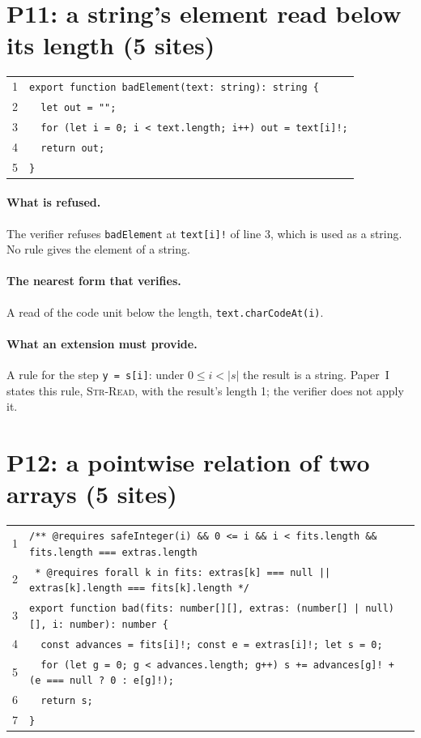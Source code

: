 \documentclass[10pt,a4paper]{article}
\theoremstyle{definition}
\theoremstyle{remark}
\newcommand{\len}[1]{|#1|}
\newcommand{\code}[1]{\texttt{#1}}
\newcommand{\entry}[1]{\paragraph{#1.}}
\begin{document}
\section{P11: a string's element read below its length (5 sites)}

{\footnotesize
\begin{tabular}{@{}r@{\hspace{1em}}l@{}}
1 & \code{export function badElement(text: string): string \{} \\
2 & \code{~~let out = "";} \\
3 & \code{~~for (let i = 0; i < text.length; i++) out = text[i]!;} \\
4 & \code{~~return out;} \\
5 & \code{\}} \\
\end{tabular}}

\entry{What is refused} The verifier refuses \code{badElement} at
\code{text[i]!} of line 3, which is used as a string. No rule gives
the element of a string.

\entry{The nearest form that verifies} A read of the code unit below the length,
\code{text.charCodeAt(i)}.

\entry{What an extension must provide} A rule for the step \code{y = s[i]}: under
$0\le i<\len{s}$ the result is a string. Paper~I states this rule,
\textsc{Str-Read}, with the result's length 1; the verifier does not
apply it.

\section{P12: a pointwise relation of two arrays (5 sites)}

{\footnotesize
\begin{tabular}{@{}r@{\hspace{1em}}l@{}}
1 & \code{/** @requires safeInteger(i) \&\& 0 <= i \&\& i < fits.length \&\& fits.length === extras.length} \\
2 & \code{~* @requires forall k in fits: extras[k] === null || extras[k].length === fits[k].length */} \\
3 & \code{export function bad(fits: number[][], extras: (number[] | null)[], i: number): number \{} \\
4 & \code{~~const advances = fits[i]!; const e = extras[i]!; let s = 0;} \\
5 & \code{~~for (let g = 0; g < advances.length; g++) s += advances[g]! + (e === null ? 0 : e[g]!);} \\
6 & \code{~~return s;} \\
7 & \code{\}} \\
\end{tabular}}
\end{document}
